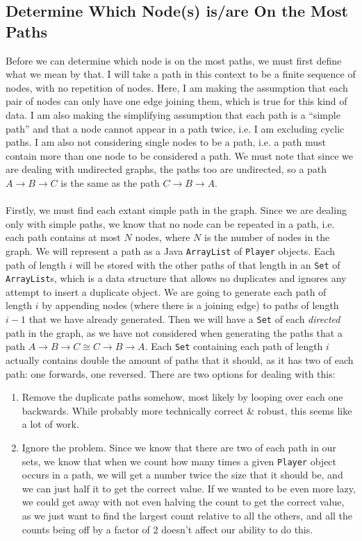 \documentclass[a4paper,11pt]{article}
\begin{document}
\subsection{Determine Which Node(s) is/are On the Most Paths}
Before we can determine which node is on the most paths, we must first define what we mean by that.
I will take a path in this context to be a finite sequence of nodes, with no repetition of nodes.
Here, I am making the assumption that each pair of nodes can only have one edge joining them, which is true for this kind of data.
I am also making the simplifying assumption that each path is a ``simple path'' and that a node cannot appear in a path twice, i.e. I am excluding cyclic paths.
I am also not considering single nodes to be a path, i.e. a path must contain more than one node to be considered a path.
We must note that since we are dealing with undirected graphs, the paths too are undirected, so a path $A \rightarrow B \rightarrow C$ is the same as the path 
$C \rightarrow B \rightarrow A$.
\\\\
Firstly, we must find each extant simple path in the graph. 
Since we are dealing only with simple paths, we know that no node can be repeated in a path, i.e. each path contains at most $N$ nodes, where $N$ is the 
number of nodes in the graph. 
We will represent a path as a Java \texttt{ArrayList} of \texttt{Player} objects. 
Each path of length $i$ will be stored with the other paths of that length in an \texttt{Set} of \texttt{ArrayList}s, which is a data structure that allows no
duplicates and ignores any attempt to insert a duplicate object.
We are going to generate each path of length $i$ by appending nodes (where there is a joining edge) to paths of length $i-1$ that we have already generated.
Then we will have a \texttt{Set} of each \emph{directed} path in the graph, as we have not considered when generating the paths that a path $A \rightarrow B \rightarrow C \cong
C \rightarrow B \rightarrow A$. 
Each \texttt{Set} containing each path of length $i$ actually contains double the amount of paths that it should, as it has two of each path: one forwards, one reversed.
There are two options for dealing with this: 
\begin{enumerate}
    \item   Remove the duplicate paths somehow, most likely by looping over each one backwards.
            While probably more technically correct \& robust, this seems like a lot of work.

    \item   Ignore the problem.
            Since we know that there are two of each path in our sets, we know that when we count how many times a given \texttt{Player} object occurs in a path, we will get a 
            number twice the size that it should be, and we can just half it to get the correct value.
            If we wanted to be even more lazy, we could get away with not even halving the count to get the correct value, as we just want to find the largest count relative to all the others,
            and all the counts being off by a factor of $2$ doesn't affect our ability to do this.
\end{enumerate}
            
\end{document}
